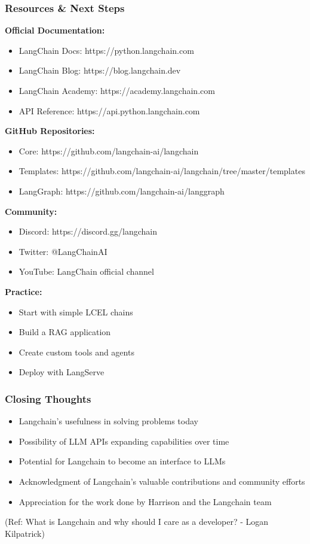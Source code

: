 \begin{frame}\frametitle{Resources \& Next Steps}

\textbf{Official Documentation:}
\begin{itemize}
\item LangChain Docs: https://python.langchain.com
\item LangChain Blog: https://blog.langchain.dev
\item LangChain Academy: https://academy.langchain.com
\item API Reference: https://api.python.langchain.com
\end{itemize}

\textbf{GitHub Repositories:}
\begin{itemize}
\item Core: https://github.com/langchain-ai/langchain
\item Templates: https://github.com/langchain-ai/langchain/tree/master/templates
\item LangGraph: https://github.com/langchain-ai/langgraph
\end{itemize}

\textbf{Community:}
\begin{itemize}
\item Discord: https://discord.gg/langchain
\item Twitter: @LangChainAI
\item YouTube: LangChain official channel
\end{itemize}

\textbf{Practice:}
\begin{itemize}
\item Start with simple LCEL chains
\item Build a RAG application
\item Create custom tools and agents
\item Deploy with LangServe
\end{itemize}

\end{frame}

\begin{frame}[fragile]\frametitle{Closing Thoughts}

\begin{itemize}
\item Langchain's usefulness in solving problems today
\item Possibility of LLM APIs expanding capabilities over time
\item Potential for Langchain to become an interface to LLMs
\item Acknowledgment of Langchain's valuable contributions and community efforts
\item Appreciation for the work done by Harrison and the Langchain team
\end{itemize}

{\tiny (Ref: What is Langchain and why should I care as a developer? - Logan Kilpatrick)}

\end{frame}
